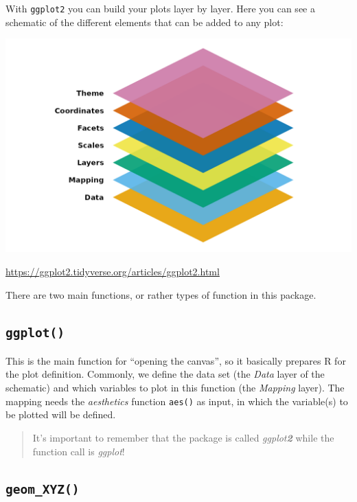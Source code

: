 \documentclass[
]{book}
\begin{document}
With \texttt{ggplot2} you can build your plots layer by layer.
Here you can see a schematic of the different elements that can be added to any plot:

\includegraphics{./img/ggplot2layers.png}

\url{https://ggplot2.tidyverse.org/articles/ggplot2.html}

There are two main functions, or rather types of function in this package.

\subsection*{\texorpdfstring{\texttt{ggplot()}}{ggplot()}}\label{ggplot}

This is the main function for ``opening the canvas'', so it basically prepares R for the plot definition.
Commonly, we define the data set (the \emph{Data} layer of the schematic) and which variables to plot in this function (the \emph{Mapping} layer).
The mapping needs the \emph{aesthetics} function \texttt{aes()} as input, in which the variable(s) to be plotted will be defined.

\begin{quote}
It's important to remember that the package is
called \emph{ggplot\textbf{2}} while the function call is \emph{ggplot}!
\end{quote}

\subsection*{\texorpdfstring{\texttt{geom\_XYZ()}}{geom\_XYZ()}}\label{geom_xyz}
\end{document}
